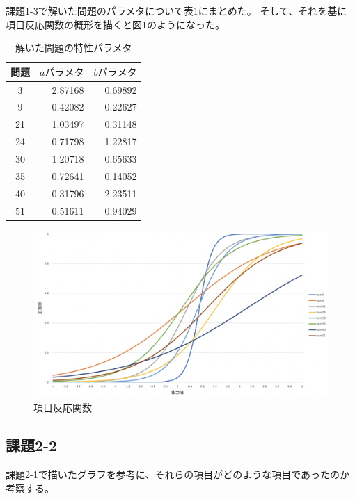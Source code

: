 \documentclass[12pt]{jarticle}
\begin{document}
課題1-3で解いた問題のパラメタについて表1にまとめた。
そして、それを基に項目反応関数の概形を描くと図1のようになった。
\begin{table}[htb]
    \begin{center}
        \caption{解いた問題の特性パラメタ}
        \begin{tabular}{|c|r|r|}
            \hline
            問題 & $aパラメタ$ & $bパラメタ$ \\
            \hline
            3    & 2.87168     & 0.69892     \\
            9    & 0.42082     & 0.22627     \\
            21   & 1.03497     & 0.31148     \\
            24   & 0.71798     & 1.22817     \\
            30   & 1.20718     & 0.65633     \\
            35   & 0.72641     & 0.14052     \\
            40   & 0.31796     & 2.23511     \\
            51   & 0.51611     & 0.94029     \\
            \hline
        \end{tabular}
    \end{center}
\end{table}
\begin{figure}[h]
    \begin{center}
        \includegraphics[scale=0.3]{kadai5_2_1.png}
    \end{center}
    \caption{項目反応関数}
\end{figure}

\clearpage
\subsection{課題2-2}
\begin{shadebox}
    課題2-1で描いたグラフを参考に、それらの項目がどのような項目であったのか考察する。
\end{shadebox}
\end{document}
